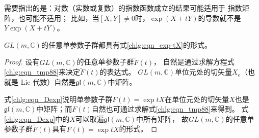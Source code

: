 需要指出的是：对数（实数或复数）的指数函数成立的结果可能适用于
指数矩阵，也可能不适用；
比如，当$[X,Y]\neq 0$时，$\exp(X+tY)$的导数就不是$Y\exp(X+tY)$。


\begin{proposition}\label{chlg:thm_GL-expA}
    $GL(m,\mathbb{C})$的任意单参数子群都具有式\eqref{chlg:eqn_exp-tX}的形式。
\end{proposition}
\begin{proof}
设有$GL(m,\mathbb{C})$的任意单参数子群$\widetilde{F}(t)$，
自然是通过求解方程式\eqref{chlg:eqn_tmp88}来决定$\widetilde{F}(t)$的表达式。
$GL(m,\mathbb{C})$单位元处的切矢量$X_e$（也就是 Lie 代数）自然是$\mathfrak{gl}(m,\mathbb{C})$中矩阵。

式\eqref{chlg:eqn_Dexp}说明单参数子群$F(t)=\exp tX$在单位元处的切矢量$X$也是
$\mathfrak{gl}(m,\mathbb{C})$中矩阵；而$F(t)$自然也可通过求解式\eqref{chlg:eqn_tmp88}来得到。
式\eqref{chlg:eqn_Dexp}中的$X$可以取遍$\mathfrak{gl}(m,\mathbb{C})$中所有矩阵，
故$GL(m,\mathbb{C})$的任意单参数子群$\widetilde{F}(t)$具有$F(t)=\exp tX$的形式。
\end{proof}


